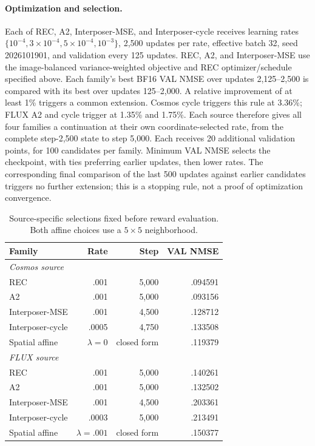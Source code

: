 \documentclass[10pt,twocolumn,letterpaper]{article}
\begin{document}
\paragraph{Optimization and selection.}
Each of REC, A2, Interposer-MSE, and Interposer-cycle receives learning rates $\{10^{-4},3\times10^{-4},5\times10^{-4},10^{-3}\}$, 2,500 updates per rate, effective batch 32, seed 2026101901, and validation every 125 updates. REC, A2, and Interposer-MSE use the image-balanced variance-weighted objective and REC optimizer/schedule specified above. Each family's best BF16 VAL NMSE over updates 2,125--2,500 is compared with its best over updates 125--2,000. A relative improvement of at least 1\% triggers a common extension. Cosmos cycle triggers this rule at 3.36\%; FLUX A2 and cycle trigger at 1.35\% and 1.75\%. Each source therefore gives all four families a continuation at their own coordinate-selected rate, from the complete step-2,500 state to step 5,000. Each receives 20 additional validation points, for 100 candidates per family. Minimum VAL NMSE selects the checkpoint, with ties preferring earlier updates, then lower rates. The corresponding final comparison of the last 500 updates against earlier candidates triggers no further extension; this is a stopping rule, not a proof of optimization convergence.

\begin{table}[t]\centering\small
\begin{tabular}{lrrr}
\toprule
Family & Rate & Step & VAL NMSE\\
\midrule
\multicolumn{4}{l}{\textit{Cosmos source}}\\
REC &.001&5,000&.094591\\
A2 &.001&5,000&.093156\\
Interposer-MSE &.001&4,500&.128712\\
Interposer-cycle &.0005&4,750&.133508\\
Spatial affine &$\lambda=0$&closed form&.119379\\
\midrule
\multicolumn{4}{l}{\textit{FLUX source}}\\
REC &.001&5,000&.140261\\
A2 &.001&5,000&.132502\\
Interposer-MSE &.001&4,500&.203361\\
Interposer-cycle &.0003&5,000&.213491\\
Spatial affine &$\lambda=.001$&closed form&.150377\\
\bottomrule
\end{tabular}
\caption{Source-specific selections fixed before reward evaluation. Both affine choices use a $5\times5$ neighborhood.}
\end{table}
\end{document}
